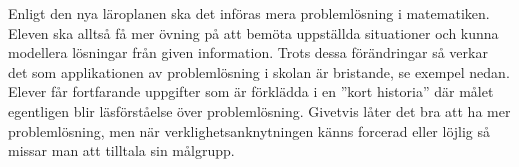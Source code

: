 





\textcolor{WildStrawberry}{
    Enligt den nya läroplanen ska det införas mera problemlösning i matematiken. Eleven ska alltså få mer övning på att bemöta uppställda situationer och kunna modellera lösningar från given information. Trots dessa förändringar så verkar det som applikationen av problemlösning i skolan är bristande, se exempel nedan. Elever får fortfarande uppgifter som är förklädda i en ''kort historia'' där målet egentligen blir läsförståelse över problemlösning. Givetvis låter det bra att ha mer problemlösning, men när verklighetsanknytningen känns forcerad eller löjlig så missar man att tilltala sin målgrupp.
}

